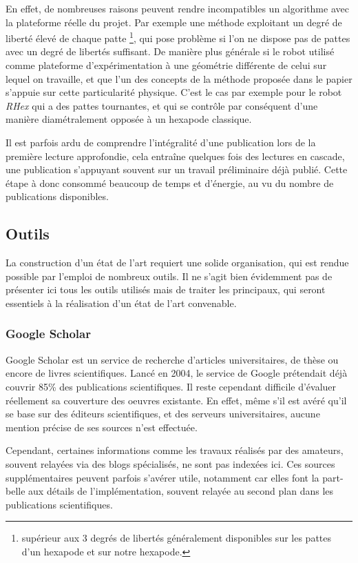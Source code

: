 \documentclass{tnreport}
\begin{document}
En effet, de nombreuses raisons peuvent rendre incompatibles un algorithme avec la plateforme réelle du projet. Par exemple une méthode exploitant un degré de liberté élevé de chaque patte \footnote{supérieur aux 3 degrés de libertés généralement disponibles sur les pattes d'un hexapode et sur notre hexapode.}, qui pose problème si l'on ne dispose pas de pattes avec un degré de libertés suffisant. De manière plus générale si le robot utilisé comme plateforme d'expérimentation à une géométrie différente de celui sur lequel on travaille, et que l'un des concepts de la méthode proposée dans le papier s'appuie sur cette particularité physique. C'est le cas par exemple pour le robot \textit{RHex}\cite{saranli_rhex:_2001} qui a des pattes tournantes, et qui se contrôle par conséquent d'une manière diamétralement opposée à un hexapode classique. 

Il est parfois ardu de comprendre l'intégralité d'une publication lors de la première lecture approfondie, cela entraîne quelques fois des lectures en cascade, une publication s'appuyant souvent sur un travail préliminaire déjà publié. Cette étape à donc consommé beaucoup de temps et d'énergie, au vu du nombre de publications disponibles.

\subsection{Outils}
La construction d'un état de l'art requiert une solide organisation, qui est rendue possible par l'emploi de nombreux outils. Il ne s'agit bien évidemment pas de présenter ici  tous les outils utilisés mais de traiter les principaux, qui seront essentiels à la réalisation d'un état de l'art convenable.  
\subsubsection{Google Scholar}\label{lb:googleScholar}
Google Scholar est un service de recherche d'articles universitaires, de thèse ou encore de livres scientifiques. Lancé en 2004, le service de Google prétendait déjà couvrir 85\% des publications scientifiques. Il reste cependant difficile d'évaluer réellement sa couverture des oeuvres existante. En effet, même s'il est avéré qu'il se base sur des éditeurs scientifiques, et des serveurs universitaires, aucune mention précise de ses sources n'est effectuée. 

Cependant, certaines informations comme les travaux réalisés par des amateurs, souvent relayées via des blogs spécialisés, ne sont pas indexées ici. Ces sources supplémentaires peuvent parfois s'avérer utile, notamment car elles font la part-belle aux détails de l'implémentation, souvent relayée au second plan dans les publications scientifiques. 
\end{document}
